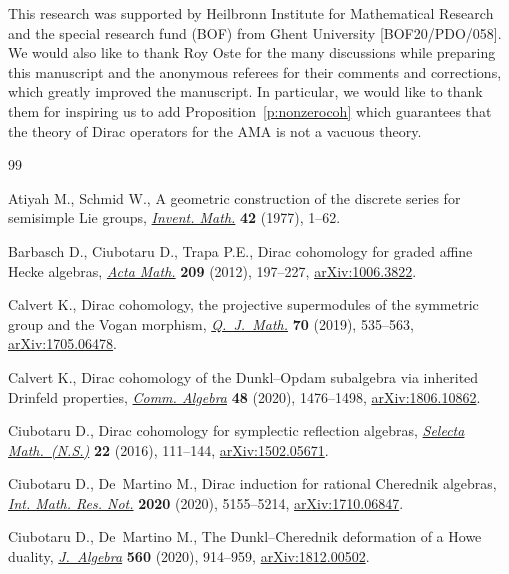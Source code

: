 \documentclass[10pt,a4paper]{amsart}
\numberwithin{equation}{section}
\begin{document}
This research was supported by Heilbronn Institute for Mathematical Research and the special research fund (BOF) from Ghent University [BOF20/PDO/058].
We would also like to thank Roy Oste for the many discussions while preparing this manuscript and the anonymous referees for their comments and corrections, which greatly improved the manuscript. In particular, we would like to thank them for inspiring us to add Proposition~\ref{p:nonzerocoh} which guarantees that the theory of Dirac operators for the AMA is not a vacuous theory.


\begin{thebibliography}{99}
\footnotesize\itemsep=0pt

Atiyah M., Schmid W., A geometric construction of the discrete series for
 semisimple {L}ie groups, \href{https://doi.org/10.1007/BF01389783}{\textit{Invent. Math.}} \textbf{42} (1977), 1--62.

Barbasch D., Ciubotaru D., Trapa P.E., Dirac cohomology for graded affine
 {H}ecke algebras, \href{https://doi.org/10.1007/s11511-012-0085-3}{\textit{Acta Math.}} \textbf{209} (2012), 197--227,
 \href{https://arxiv.org/abs/1006.3822}{arXiv:1006.3822}.

Calvert K., Dirac cohomology, the projective supermodules of the symmetric
 group and the {V}ogan morphism, \href{https://doi.org/10.1093/qmath/hay057}{\textit{Q.~J.~Math.}} \textbf{70} (2019),
 535--563, \href{https://arxiv.org/abs/1705.06478}{arXiv:1705.06478}.

Calvert K., Dirac cohomology of the {D}unkl--{O}pdam subalgebra via inherited
 {D}rinfeld properties, \href{https://doi.org/10.1080/00927872.2019.1691567}{\textit{Comm. Algebra}} \textbf{48} (2020), 1476--1498,
 \href{https://arxiv.org/abs/1806.10862}{arXiv:1806.10862}.

Ciubotaru D., Dirac cohomology for symplectic reflection algebras,
 \href{https://doi.org/10.1007/s00029-015-0189-7}{\textit{Selecta Math.~(N.S.)}} \textbf{22} (2016), 111--144,
 \href{https://arxiv.org/abs/1502.05671}{arXiv:1502.05671}.

Ciubotaru D., De~Martino M., Dirac induction for rational {C}herednik algebras,
 \href{https://doi.org/10.1093/imrn/rny153}{\textit{Int. Math. Res. Not.}} \textbf{2020} (2020), 5155--5214,
 \href{https://arxiv.org/abs/1710.06847}{arXiv:1710.06847}.

Ciubotaru D., De~Martino M., The {D}unkl--{C}herednik deformation of a {H}owe
 duality, \href{https://doi.org/10.1016/j.jalgebra.2020.05.034}{\textit{J.~Algebra}} \textbf{560} (2020), 914--959,
 \href{https://arxiv.org/abs/1812.00502}{arXiv:1812.00502}.


\end{thebibliography}
\end{document}
